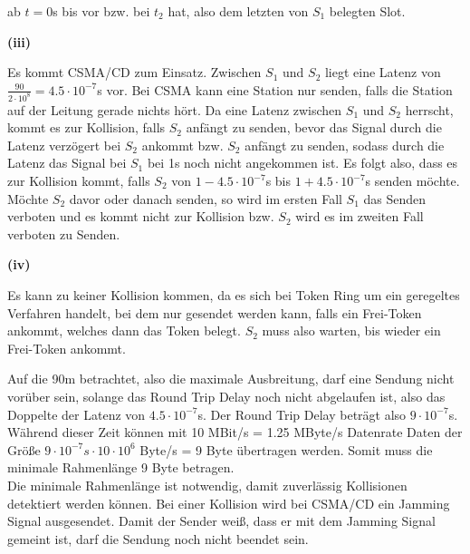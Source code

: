 \documentclass{../exercisesheet}
\begin{document}
\begin{exercise}{6}
\begin{subexercise}
\begin{adjustwidth}{2em}{0em}
	ab $t=0$s bis
	 vor bzw. bei $t_2$ hat, also dem letzten von $S_1$ belegten Slot.\\ 
\end{adjustwidth}
\textbf{(iii)}
\begin{adjustwidth}{2em}{0em}\vspace{-\baselineskip}
	Es kommt CSMA/CD zum Einsatz. Zwischen $S_1$ und $S_2$ liegt eine Latenz von $\frac{90}{2 \cdot 10^8}= 4.5\cdot 10^{-7}$s vor. Bei CSMA kann eine Station nur senden, 
	falls die Station auf der Leitung gerade nichts hört. Da eine Latenz zwischen $S_1$ und $S_2$ herrscht, kommt es zur Kollision, falls $S_2$ anfängt zu senden, bevor
	das Signal durch die Latenz verzögert bei $S_2$ ankommt bzw. $S_2$ anfängt zu senden, sodass durch die Latenz das Signal bei $S_1$ bei 1s noch nicht angekommen ist.
	Es folgt also, dass es zur Kollision kommt, falls $S_2$ von $1-4.5\cdot 10^{-7}$s bis $1+4.5\cdot 10^{-7}$s senden möchte. Möchte $S_2$ davor oder danach senden, so
	wird im ersten Fall $S_1$ das Senden verboten und es kommt nicht zur Kollision bzw. $S_2$ wird es im zweiten Fall verboten zu Senden.\\
\end{adjustwidth}
\textbf{(iv)}
\begin{adjustwidth}{2em}{0em}\vspace{-\baselineskip}
	Es kann zu keiner Kollision kommen, da es sich bei Token Ring um ein geregeltes Verfahren handelt, bei dem nur gesendet werden kann, falls ein Frei-Token ankommt, 
	welches dann das Token belegt. $S_2$ muss also warten, bis wieder ein Frei-Token ankommt.
\end{adjustwidth}
\end{subexercise}
\begin{subexercise}
	Auf die 90m betrachtet, also die maximale Ausbreitung, darf eine Sendung nicht vorüber sein, solange das Round Trip Delay noch nicht abgelaufen ist, also das Doppelte
	der Latenz von $4.5\cdot 10^{-7}$s. Der Round Trip Delay beträgt also $9\cdot 10^{-7}$s. Während dieser Zeit können mit 10 MBit/s = 1.25 MByte/s Datenrate Daten der
	Größe $9\cdot 10^{-7}s \cdot 10 \cdot 10^6$ Byte/s = 9 Byte übertragen werden. Somit muss die minimale Rahmenlänge 9 Byte betragen.\\
	Die minimale Rahmenlänge ist notwendig, damit zuverlässig Kollisionen detektiert werden können. Bei einer Kollision wird bei CSMA/CD ein Jamming Signal ausgesendet. Damit
	der Sender weiß, dass er mit dem Jamming Signal gemeint ist, darf die Sendung noch nicht beendet sein.

\end{subexercise}
\end{exercise}
\end{document}
